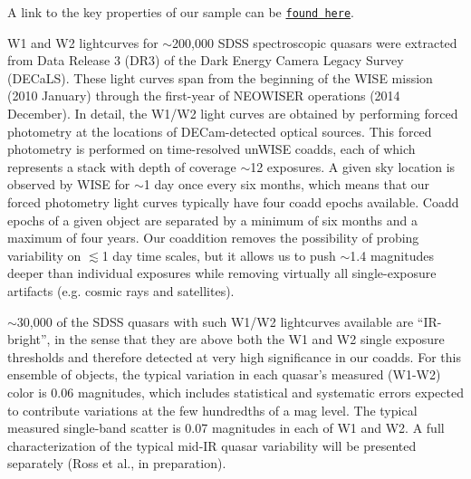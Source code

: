 \documentclass{emulateapj}
\begin{document}
%

%


%
%
%
%

A link to the key properties of our sample can be
\href{http://portal.nersc.gov/project/cosmo/temp/ameisner/qso\_pages\_v01/}
{\tt found here}.

W1 and W2 lightcurves for $\sim$200,000 SDSS spectroscopic quasars were 
extracted from Data Release 3 (DR3) of the Dark Energy Camera Legacy Survey 
(DECaLS). These light curves span from the beginning of the WISE mission 
(2010 January) through the first-year of NEOWISER operations 
(2014 December). In detail, the W1/W2 light curves are obtained by performing 
forced photometry at the locations of DECam-detected optical sources. This 
forced photometry is performed on time-resolved unWISE coadds, each of which 
represents a stack with depth of coverage $\sim$12 exposures. A given sky 
location is observed by 
WISE for $\sim$1 day once every six months, which means that our forced 
photometry 
light curves typically have four coadd epochs available. Coadd epochs of a
given object are separated by a minimum of six months and a maximum of
four years. Our coaddition removes the possibility of probing variability on 
$\lesssim$1 day time scales, but it allows us to push $\sim$1.4 magnitudes 
deeper than individual exposures while removing virtually all single-exposure 
artifacts (e.g. cosmic rays and satellites).

$\sim$30,000 of the SDSS quasars with such W1/W2 lightcurves available are 
``IR-bright'', in the sense that they are above both the W1 and W2 single 
exposure thresholds and therefore detected at very high significance in our 
coadds. For this ensemble of objects, the typical variation in each quasar's 
measured (W1-W2) color is 0.06 magnitudes, which includes 
statistical and systematic errors expected to contribute variations
at the few hundredths of a mag level. The typical measured single-band scatter 
is 0.07 magnitudes in each of W1 and W2. A full characterization of
the typical mid-IR quasar variability will be presented separately 
(Ross et al., in preparation).
\end{document}
